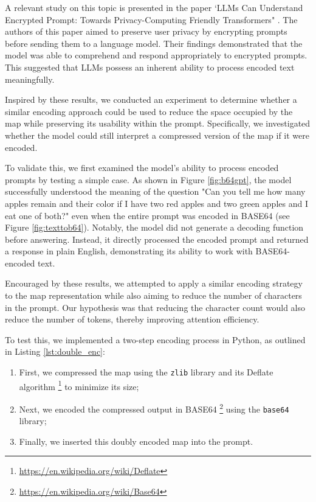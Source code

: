 A relevant study on this topic is presented in the paper `LLMs Can Understand Encrypted
Prompt: Towards Privacy-Computing Friendly Transformers" \cite{liu2023llmsunderstandencryptedprompt}.
The authors of this paper aimed to preserve user privacy by encrypting prompts
before sending them to a language model. Their findings demonstrated that the model
was able to comprehend and respond appropriately to encrypted prompts. This
suggested that LLMs possess an inherent ability to process encoded text
meaningfully.

Inspired by these results, we conducted an experiment to determine whether a similar
encoding approach could be used to reduce the space occupied by the map while preserving
its usability within the prompt. Specifically, we investigated whether the model
could still interpret a compressed version of the map if it were encoded.

To validate this, we first examined the model's ability to process encoded
prompts by testing a simple case. As shown in Figure \ref{fig:b64gpt}, the model
successfully understood the meaning of the question "Can you tell me how many apples
remain and their color if I have two red apples and two green apples and I eat one
of both?" even when the entire prompt was encoded in BASE64 (see Figure
\ref{fig:texttob64}). Notably, the model did not generate a decoding function before
answering. Instead, it directly processed the encoded prompt and returned a response
in plain English, demonstrating its ability to work with BASE64-encoded text.

Encouraged by these results, we attempted to apply a similar encoding strategy to
the map representation while also aiming to reduce the number of characters in the
prompt. Our hypothesis was that reducing the character count would also reduce
the number of tokens, thereby improving attention efficiency.

To test this, we implemented a two-step encoding process in Python, as outlined in
Listing \ref{lst:double_enc}:
\begin{enumerate}
  \item First, we compressed the map using the \texttt{zlib} library and its Deflate
    algorithm \footnote{\url{https://en.wikipedia.org/wiki/Deflate}} to minimize
    its size;

  \item Next, we encoded the compressed output in BASE64 \footnote{\url{https://en.wikipedia.org/wiki/Base64}}
    using the \texttt{base64} library;

  \item Finally, we inserted this doubly encoded map into the prompt.
\end{enumerate}

